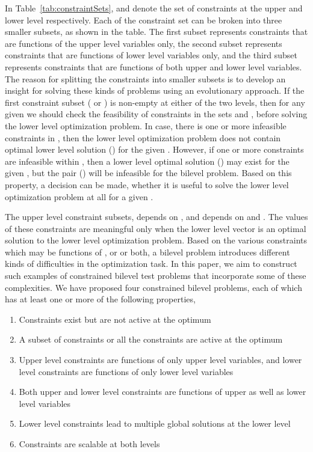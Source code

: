 \documentclass[twoside]{article}
\begin{document}
In Table~\ref{tab:constraintSets},  and  denote the set of constraints at the upper and lower level respectively. Each of the constraint set can be broken into three smaller subsets, as shown in the table. The first subset represents constraints that are functions of the upper level variables only, the second subset represents constraints that are functions of lower level variables only, and the third subset represents constraints that are functions of both upper and lower level variables. The reason for splitting the constraints into smaller subsets is to develop an insight for solving these kinds of problems using an evolutionary approach. If the first constraint subset ( or ) is non-empty at either of the two levels, then for any given  we should check the feasibility of constraints in the sets  and , before solving the lower level optimization problem. In case, there is one or more infeasible constraints in , then the lower level optimization problem does not contain optimal lower level solution () for the given . However, if one or more constraints are infeasible within , then a lower level optimal solution () may exist for the given , but the pair () will be infeasible for the bilevel problem. Based on this property, a decision can be made, whether it is useful to solve the lower level optimization problem at all for a given .

The upper level constraint subsets,  depends on , and  depends on  and . The values of these constraints are meaningful only when the lower level vector is an optimal solution to the lower level optimization problem. Based on the various constraints which may be functions of , or  or both, a bilevel problem introduces different kinds of difficulties in the optimization task. In this paper, we aim to construct such examples of constrained bilevel test problems that incorporate some of these complexities. We have proposed four constrained bilevel problems, each of which has at least one or more of the following properties,

\begin{enumerate}
\item Constraints exist but are not active at the optimum
\item A subset of constraints or all the constraints are active at the optimum
\item Upper level constraints are functions of only upper level variables, and lower level constraints are functions of only lower level variables
\item Both upper and lower level constraints are functions of upper as well as lower level variables
\item Lower level constraints lead to multiple global solutions at the lower level
\item Constraints are scalable at both levels
\end{enumerate}
\end{document}

